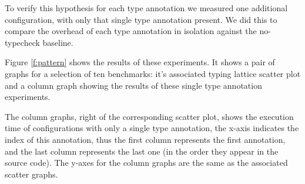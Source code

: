 \documentclass[sigplan,screen]{acmart}
\begin{document}

To verify this hypothesis 
for each type annotation we measured one additional
configuration, with only that single type annotation present.
We did this to compare the overhead of
each type annotation in isolation against the no-typecheck baseline.

Figure \ref{f:pattern} shows the results of these experiments.
It shows a pair of graphs for a selection of ten benchmarks: it's associated typing lattice scatter plot and a column graph showing the results of these single type annotation experiments.

The column graphs, right of the corresponding scatter plot, shows the execution time of configurations with only a single type annotation, the x-axis indicates the index of this annotation, thus the first column represents the first annotation, and the last column represents the last one (in the order they appear in the source code). The y-axes for the column graphs are the same as the associated scatter graphs.

\end{document}
